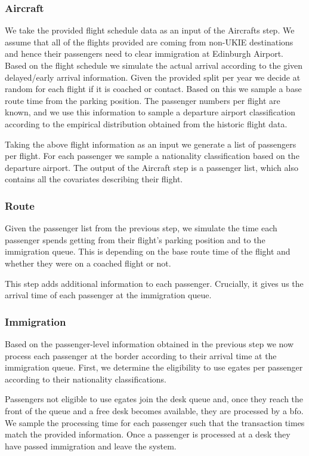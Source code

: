 \documentclass[10pt]{article}
\begin{document}
\subsubsection{Aircraft}
We take the provided flight schedule data as an input of the Aircrafts step. We assume that all of the flights provided are coming from non-UKIE destinations and hence their passengers need to clear immigration at Edinburgh Airport. Based on the flight schedule we simulate the actual arrival according to the given delayed/early arrival information. Given the provided split per year we decide at random for each flight if it is coached or contact. Based on this we sample a base route time from the parking position. The passenger numbers per flight are known, and we use this information to sample a departure airport classification according to the empirical distribution obtained from the historic flight data.

Taking the above flight information as an input we generate a list of passengers per flight. For each passenger we sample a nationality classification based on the departure airport. The output of the Aircraft step is a passenger list, which also contains all the covariates describing their flight.

\subsubsection{Route}

Given the passenger list from the previous step, we simulate the time each passenger spends getting from their flight's parking position and to the immigration queue. This is depending on the base route time 
of the flight and whether they were on a coached flight or not.

This step adds additional information to each passenger. Crucially, it gives us the arrival time of each passenger at the immigration queue. 

\subsubsection{Immigration}

Based on the passenger-level information obtained in the previous step we now process each passenger at the border according to their arrival time at the immigration queue. First, we determine the eligibility to use \glspl{egate} per passenger according to their nationality classifications. 

Passengers not eligible to use \glspl{egate} join the desk queue and, once they reach the front of the queue and a free desk becomes available, they are processed by a \gls{bfo}. We sample the processing time for each passenger such that the transaction times match the provided information. Once a passenger is processed at a desk they have passed immigration and leave the system.
\end{document}
